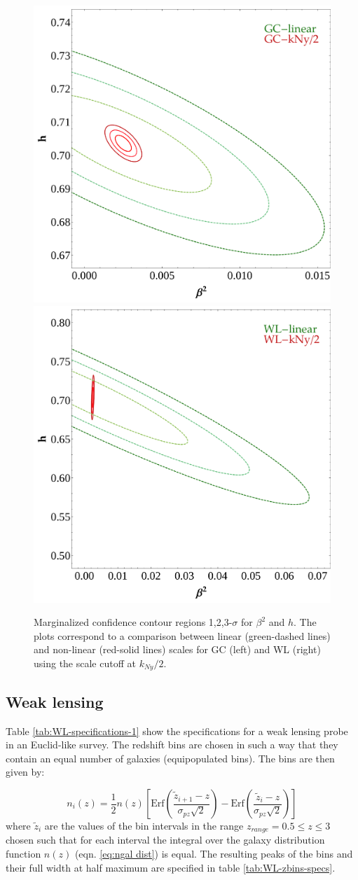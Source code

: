 \begin{figure}
\centering{}\includegraphics[height=0.4\textwidth]{Chapters/fitting-funcs/figures/GC-linear-vs-PkCut-1p1-kNy-margedContours-h-beta}
\includegraphics[height=0.4\textwidth]{Chapters/fitting-funcs/figures/WL-linear-vs-PkCut-1p1-kNy-margedContours-h-beta}
\caption[Fisher confidence contour regions
for $\beta^{2}$ and $h$ in CDE using GC and WL surveys.]{\label{fig:Contour-scale} Marginalized confidence contour regions
1,2,3-$\sigma$ for $\beta^{2}$ and $h$. The plots correspond to
a comparison between linear (green-dashed lines) and non-linear (red-solid
lines) scales for GC (left) and WL (right) using the scale cutoff
at $k_{Ny}/2$. }
\end{figure}



\subsection{Weak lensing}

Table \ref{tab:WL-specifications-1} show the specifications for a
weak lensing probe in an Euclid-like survey. The redshift bins are
chosen in such a way that they contain an equal number of galaxies
(equipopulated bins). The bins are then given by:

\begin{equation}
n_{i}(z)=\frac{1}{2}n(z)\left[\mbox{Erf}\left(\frac{\tilde{z}_{i+1}-z}{\sigma_{pz}\sqrt{2}}\right)-\mbox{Erf}\left(\frac{\tilde{z}_{i}-z}{\sigma_{pz}\sqrt{2}}\right)\right]
\end{equation}
where $\tilde{z}_{i}$ are the values of the bin intervals in the
range $z_{range}=0.5\leq z\leq3$ chosen such that for each interval
the integral over the galaxy distribution function $n(z)$ (eqn. \ref{eq:ngal dist})
is equal. The resulting peaks of the bins and their full width at
half maximum are specified in table \ref{tab:WL-zbins-specs}.

